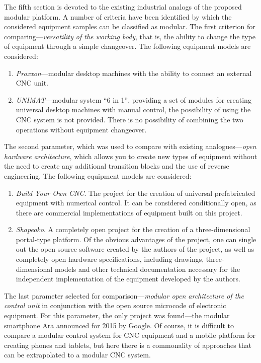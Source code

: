 The fifth section is devoted to the existing industrial analogs of the proposed modular platform. A number of criteria have been identified by which the considered equipment samples can be classified as modular. The first criterion for comparing---\textit{versatility of the working body}, that is, the ability to change the type of equipment through a simple changeover. The following equipment models are considered:

\begin{enumerate}
	\item\textit{Proxxon}---modular desktop machines with the ability to connect an external CNC unit.
	\item\textit{UNIMAT}---modular system ``6 in 1'', providing a set of modules for creating universal desktop machines with manual control, the possibility of using the CNC system is not provided. There is no possibility of combining the two operations without equipment changeover.
\end{enumerate}

The second parameter, which was used to compare with existing analogues---\textit{open hardware architecture}, which allows you to create new types of equipment without the need to create any additional transition blocks and the use of reverse engineering. The following equipment models are considered:

\begin{enumerate}
	\item\textit{Build Your Own CNC}. The project for the creation of universal prefabricated equipment with numerical control. It can be considered conditionally open, as there are commercial implementations of equipment built on this project.
	\item\textit{Shapeoko}. A completely open project for the creation of a three-dimensional portal-type platform. Of the obvious advantages of the project, one can single out the open source software created by the authors of the project, as well as completely open hardware specifications, including drawings, three-dimensional models and other technical documentation necessary for the independent implementation of the equipment developed by the authors.
\end{enumerate}

The last parameter selected for comparison---\textit{modular open architecture of the control unit} in conjunction with the open source microcode of electronic equipment. For this parameter, the only project was found---the modular smartphone Ara announced for 2015 by Google. Of course, it is difficult to compare a modular control system for CNC equipment and a mobile platform for creating phones and tablets, but here there is a commonality of approaches that can be extrapolated to a modular CNC system.

